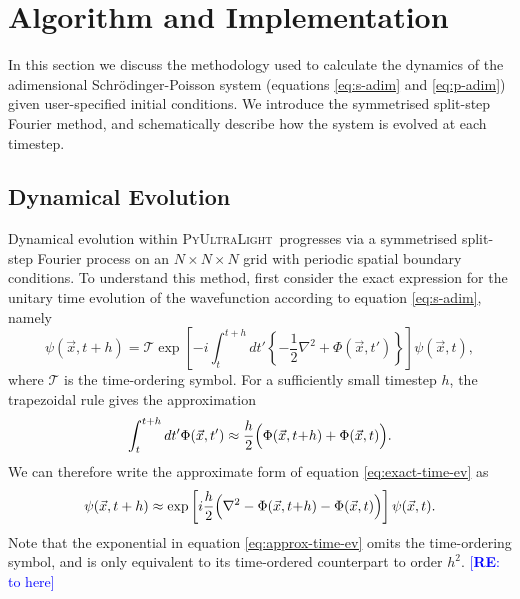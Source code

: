 \documentclass[a4paper,11pt]{article}
\newcommand{\PyUltraLight}{\textsc{PyUltraLight}\xspace}
\newcommand{\re}[1]{\textcolor{blue}{[{\bf RE}: #1]}}
\begin{document}
\section{Algorithm and Implementation}\label{sec:implementation}

In this section we discuss the methodology used to calculate the dynamics of the adimensional  Schr{\"o}dinger-Poisson system (equations \ref{eq:s-adim} and \ref{eq:p-adim}) given user-specified initial conditions. We introduce the symmetrised split-step Fourier method, and schematically describe  how the system is evolved at each timestep. 

\subsection{Dynamical Evolution}\label{sec:dynamics}

Dynamical evolution within \PyUltraLight\ progresses via a symmetrised split-step Fourier process on an $N\times N\times N$  grid with  periodic spatial boundary conditions. To understand this method,  first consider the exact expression for the unitary time evolution of the wavefunction according to equation \ref{eq:s-adim}, namely
\begin{equation}\label{eq:exact-time-ev}
    \psi(\vec{x},t+h)=\mathcal{T}\operatorname{exp}\left[-i\int_t^{t+h}dt'\left\{-\frac{1}{2}\nabla^2+\Phi(\vec{x},t')\right\}\right]\psi(\vec{x},t),
\end{equation}
where $\mathcal{T}$ is the time-ordering symbol. For a sufficiently small timestep $h$,  the trapezoidal rule gives the approximation
\begin{equation}
    \int_t^{t+h}dt'\Phi(\vec{x},t')\approx \frac{h}{2}\Big(\Phi(\vec{x},t\hspace*{-.2em}+\hspace*{-.2em}h)+\Phi(\vec{x},t)\Big).
\end{equation}
We can therefore write the approximate form of equation \ref{eq:exact-time-ev} as
\begin{equation}\label{eq:approx-time-ev}
    \psi(\vec{x},t+h)\approx \operatorname{exp}\left[i\frac{h}{2}\Big(\nabla^2-\Phi(\vec{x},t\hspace*{-.2em}+\hspace*{-.2em}h)-\Phi(\vec{x},t)\Big)\right]\psi(\vec{x},t).
\end{equation}
Note that the exponential in equation \ref{eq:approx-time-ev} omits the time-ordering symbol, and is only equivalent to its time-ordered counterpart to order $h^2$. \re{to here}
\end{document}
